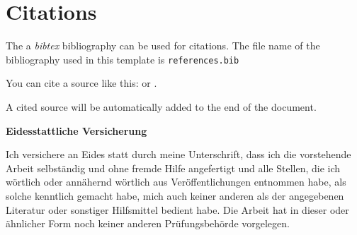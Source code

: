 \documentclass[11pt,a4paper]{article}
\begin{document}
\restoregeometry

\begin{abstract}
The abstract is written directly in the YAML header.
\end{abstract}

{
\hypersetup{linkcolor=black}
\setcounter{tocdepth}{3}
\tableofcontents
}


\newpage
\printnoidxglossary[type=acronym, style=superheader,title=Acronyms]

\newpage
\listoftables
\newpage
\listoffigures
\newpage
{} 


\section{Citations}\label{citations}

The a \emph{bibtex} bibliography can be used for citations. The file
name of the bibliography used in this template is
\texttt{references.bib}

You can cite a source like this: \autocite{Keil_2012} or
\textcite{Litterman1986}.

A cited source will be automatically added to the end of the document.
\renewcommand*{\mkbibnamefamily}[1]{\textbf{#1}}
\renewcommand*{\mkbibnamegiven}[1]{\textbf{#1}}
\renewcommand*{\mkbibnameprefix}[1]{\textbf{#1}}
\renewcommand*{\mkbibnamesuffix}[1]{\textbf{#1}}
\printbibliography[title=References]

\newpage
\textbf{Eidesstattliche Versicherung}

\bigskip

Ich versichere an Eides statt durch meine Unterschrift, dass ich die vorstehende Arbeit selbständig und ohne fremde Hilfe angefertigt und alle Stellen, die ich wörtlich oder annähernd wörtlich aus Veröffentlichungen entnommen habe, als solche kenntlich gemacht habe, mich auch keiner anderen als der angegebenen Literatur oder sonstiger Hilfsmittel bedient habe. Die Arbeit hat in dieser oder ähnlicher Form noch keiner anderen Prüfungsbehörde vorgelegen.

\vspace{1cm}
\rule{0pt}{2\baselineskip} %
\par\noindent{} \hfill\makebox[2.25in]{\hrulefill}%
\par\noindent\makebox[2.25in][l]{} \hfill{}%
\end{document}
